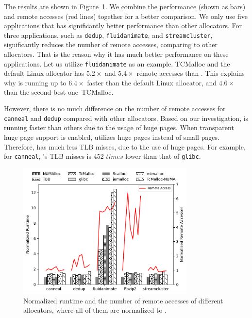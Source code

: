 The results are shown in Figure~\ref{fig:remoteAccess}. We combine the performance (shown as bars) and remote accesses (red lines) together for a better comparison. We only use five applications that \NM{} has significantly better performance than other allocators.  For three applications, such as \texttt{dedup}, \texttt{fluidanimate}, and \texttt{streamcluster}, \NM{}  significantly reduces the number of remote accesses, comparing to other allocators. That is the reason why it has much better performance on these applications. Let us utilize \texttt{fluidanimate} as an example. TCMalloc and the default Linux allocator has  $5.2\times$ and $5.4\times$ remote accesses than \NM{}. This explains why \NM{} is running up to $6.4\times$ faster than the default Linux allocator, and  $4.6\times$ than the second-best one--TCMalloc. 

However, there is no much difference on the number of remote accesses for \texttt{canneal} and \texttt{dedup} compared with other allocators. Based on our investigation, \NM{} is running faster than others due to the usage of huge pages. When transparent huge page support is enabled, \NM{} utilizes huge pages instead of small pages. Therefore, \NM{} has much less TLB misses, due to the use of huge pages. For example, for \texttt{canneal}, \NM{}'s TLB misses is 452 $times$ lower than that of \texttt{glibc}.




\begin{figure}[!h]
    \centering
    \includegraphics[width=3.5in]{figure/remote-access.pdf}
    \caption{Normalized runtime and the number of remote accesses of different allocators, where all of them are normalized to \NM{}. }
    \label{fig:remoteAccess}
\end{figure}

